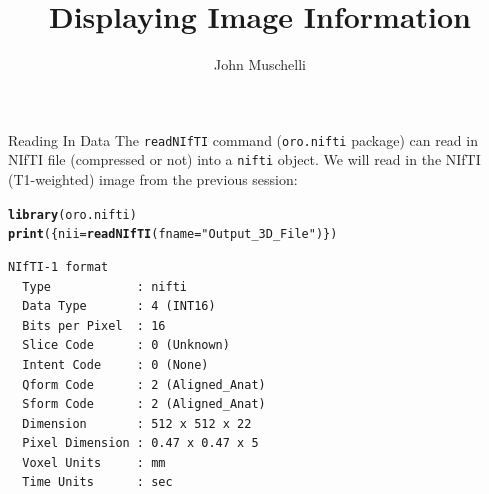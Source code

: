 \documentclass[11pt]{beamer}\usepackage[]{graphicx}\usepackage[]{color}
\author{John Muschelli}
\title{Displaying Image Information}
\institute{Johns Hopkins Bloomberg School of Public Health}
\makeatletter
\newcommand{\hlstr}[1]{\textcolor[rgb]{0.192,0.494,0.8}{#1}}%
\newcommand{\hlstd}[1]{\textcolor[rgb]{0.345,0.345,0.345}{#1}}%
\newcommand{\hlkwb}[1]{\textcolor[rgb]{0.69,0.353,0.396}{#1}}%
\newcommand{\hlkwc}[1]{\textcolor[rgb]{0.333,0.667,0.333}{#1}}%
\newcommand{\hlkwd}[1]{\textcolor[rgb]{0.737,0.353,0.396}{\textbf{#1}}}%
\newenvironment{kframe}{%
 \def\at@end@of@kframe{}%
 \ifinner\ifhmode%
  \def\at@end@of@kframe{\end{minipage}}%
  \begin{minipage}{\columnwidth}%
 \fi\fi%
 \def\FrameCommand##1{\hskip\@totalleftmargin \hskip-\fboxsep
 \colorbox{shadecolor}{##1}\hskip-\fboxsep
     \hskip-\linewidth \hskip-\@totalleftmargin \hskip\columnwidth}%
 \MakeFramed {\advance\hsize-\width
   \@totalleftmargin\z@ \linewidth\hsize
   \@setminipage}}%
 {\par\unskip\endMakeFramed%
 \at@end@of@kframe}
\newenvironment{knitrout}{}{} %
\makeatother
\begin{document}
\begin{frame}
\titlepage
\end{frame}




\begin{frame}[fragile]{Reading In Data}
The \verb|readNIfTI| command (\verb|oro.nifti| package) can read in NIfTI file (compressed or not) into a \verb|nifti| object.  We will read in the NIfTI (T1-weighted) image from the previous session:

\begin{knitrout}
\color{fgcolor}\begin{kframe}
\begin{alltt}
\hlkwd{library}\hlstd{(oro.nifti)}
\hlkwd{print}\hlstd{(\{nii} \hlkwb{=} \hlkwd{readNIfTI}\hlstd{(}\hlkwc{fname} \hlstd{=} \hlstr{"Output_3D_File"}\hlstd{)\})}
\end{alltt}
\begin{verbatim}
NIfTI-1 format
  Type            : nifti
  Data Type       : 4 (INT16)
  Bits per Pixel  : 16
  Slice Code      : 0 (Unknown)
  Intent Code     : 0 (None)
  Qform Code      : 2 (Aligned_Anat)
  Sform Code      : 2 (Aligned_Anat)
  Dimension       : 512 x 512 x 22
  Pixel Dimension : 0.47 x 0.47 x 5
  Voxel Units     : mm
  Time Units      : sec
\end{verbatim}
\end{kframe}
\end{knitrout}
\end{frame}
\end{document}

